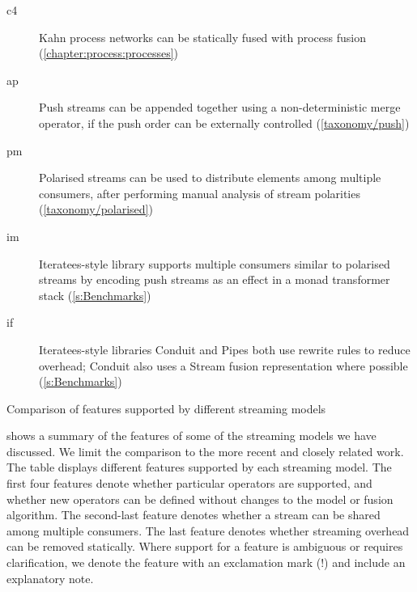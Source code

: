 \begin{table}
\begin{description}
\item[c4]Kahn process networks can be statically fused with process fusion (\cref{chapter:process:processes})
\item[ap]Push streams can be appended together using a non-deterministic merge operator, if the push order can be externally controlled (\cref{taxonomy/push})
\item[pm]Polarised streams can be used to distribute elements among multiple consumers, after performing manual analysis of stream polarities (\cref{taxonomy/polarised})
\item[im]Iteratees-style library \Streaming \citep{hackage:streaming} supports multiple consumers similar to polarised streams by encoding push streams as an effect in a monad transformer stack (\cref{s:Benchmarks})
\item[if]Iteratees-style libraries Conduit \citep{hackage:conduit} and Pipes \citep{hackage:pipes} both use rewrite rules to reduce overhead; Conduit also uses a Stream fusion representation where possible (\cref{s:Benchmarks})
\end{description}
\caption{Comparison of features supported by different streaming models}
\label{03-body/02-process/07-related/table}
\end{table}

 shows a summary of the features of some of the streaming models we have discussed.
We limit the comparison to the more recent and closely related work.
The table displays different features supported by each streaming model.
The first four features denote whether particular operators are supported, and whether new operators can be defined without changes to the model or fusion algorithm.
The second-last feature denotes whether a stream can be shared among multiple consumers.
The last feature denotes whether streaming overhead can be removed statically.
Where support for a feature is ambiguous or requires clarification, we denote the feature with an exclamation mark (!) and include an explanatory note.

